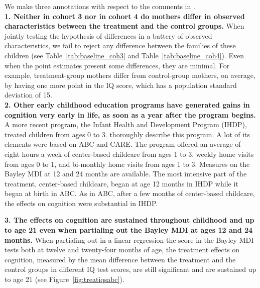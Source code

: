 \begin{appendices}
\noindent We make three annotations with respect to the comments in \citet{Spitz_1992_ABC-Retardation}.\\ 

\noindent \textbf{1. Neither in cohort 3 nor in cohort 4 do mothers differ in observed characteristics between the treatment and the control groups.} When jointly testing the hypothesis of differences in a battery of observed characteristics, we fail to reject any difference between the families of these children (see Table~\ref{tab:baseline_coh3} and Table~\ref{tab:baseline_coh4}). Even when the point estimates present some differences, they are minimal. For example, treatment-group mothers differ from control-group mothers, on average, by having one more point in the IQ score, which has a population standard deviation of 15.\\

\noindent \textbf{2. Other early childhood education programs have generated gains in cognition very early in life, as soon as a year after the program begins.} A more recent program, the Infant Health and Development Program (IHDP), treated children from ages 0 to 3. \citet{Gross_Spiker_etal_1997_BOOKHelpinglowbirth} thoroughly describe this program. A lot of its elements were based on ABC and CARE. The program offered an average of eight hours a week of center-based childcare from ages 1 to 3, weekly home visits from ages 0 to 1, and bi-monthly home visits from ages 1 to 3. Measures on the Bayley MDI at 12 and 24 months are available. The most intensive part of the treatment, center-based childcare, began at age 12 months in IHDP while it began at birth in ABC. As in ABC, after a few months of center-based childcare, the effects on cognition were substantial in IHDP.



\noindent \textbf{3. The effects on cognition are sustained throughout childhood and up to age 21 even when partialing out the Bayley MDI at ages 12 and 24 months.} When partialing out in a linear regression the score in the Bayley MDI tests both at twelve and twenty-four months of age, the treatment effects on cognition, measured by the mean difference between the treatment and the control groups in different IQ test scores, are still significant and are sustained up to age 21 (see Figure~\ref{fig:treatiqsabc}).


\end{appendices}

